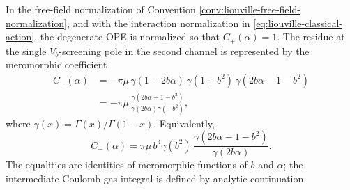 \begin{lemma}
\label{lem:liouville-degenerate-screening-coefficient}
In the free-field normalization of Convention
\ref{conv:liouville-free-field-normalization}, and with the interaction
normalization in \eqref{eq:liouville-classical-action}, the degenerate OPE is
normalized so that \(C_+(\alpha)=1\).  The residue at the single
\(V_b\)-screening pole in the second channel is represented by the
meromorphic coefficient
\begin{equation}
\begin{aligned}
  C_-(\alpha)
  &=
  -\pi\mu\,
  \gamma(1-2b\alpha)\,
  \gamma(1+b^2)\,
  \gamma(2b\alpha-1-b^2)
  \\
  &=
  -\pi\mu\,
  \frac{\gamma(2b\alpha-1-b^2)}
       {\gamma(2b\alpha)\gamma(-b^2)} ,
\end{aligned}
  \label{eq:liouville-coulomb-gas-cminus}
\end{equation}
where \(\gamma(x)=\Gamma(x)/\Gamma(1-x)\).  Equivalently,
\[
  C_-(\alpha)
  =
  \pi\mu\,b^4\gamma(b^2)\,
  \frac{\gamma(2b\alpha-1-b^2)}{\gamma(2b\alpha)} .
\]
The equalities are identities of meromorphic functions of \(b\) and
\(\alpha\); the intermediate Coulomb-gas integral is defined by analytic
continuation.
\end{lemma}

